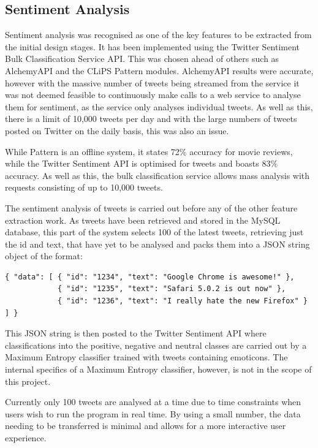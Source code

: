 \subsection{Sentiment Analysis}
Sentiment analysis was recognised as one of the key features to be extracted from the initial design stages. It has been implemented using the Twitter Sentiment Bulk Classification Service API. This was chosen ahead of others such as AlchemyAPI\cite{alchemyapi} and the CLiPS Pattern modules. AlchemyAPI results were accurate, however with the massive number of tweets being streamed from the service it was not deemed feasible to continuously make calls to a web service to analyse them for sentiment, as the service only analyses individual tweets. As well as this, there is a limit of 10,000 tweets per day and with the large numbers of tweets posted on Twitter on the daily basis, this was also an issue.

While Pattern is an offline system, it states 72\% accuracy for movie reviews\cite{pattern}, while the Twitter Sentiment API is optimised for tweets and boasts 83\% accuracy\cite{Go_Bhayani_Huang_2009}. As well as this, the bulk classification service allows mass analysis with requests consisting of up to 10,000 tweets.

The sentiment analysis of tweets is carried out before any of the other feature extraction work. As tweets have been retrieved and stored in the MySQL database, this part of the system selects 100 of the latest tweets, retrieving just the id and text, that have yet to be analysed and packs them into a JSON string object of the format:

\begin{verbatim}
{ "data": [ { "id": "1234", "text": "Google Chrome is awesome!" },
            { "id": "1235", "text": "Safari 5.0.2 is out now" },
            { "id": "1236", "text": "I really hate the new Firefox" } ] }
\end{verbatim}

This JSON string is then posted to the Twitter Sentiment API where classifications into the positive, negative and neutral classes are carried out by a Maximum Entropy classifier trained with tweets containing emoticons. The internal specifics of a Maximum Entropy classifier, however, is not in the scope of this project. %

Currently only 100 tweets are analysed at a time due to time constraints when users wish to run the program in real time. By using a small number, the data needing to be transferred is minimal and allows for a more interactive user experience.

